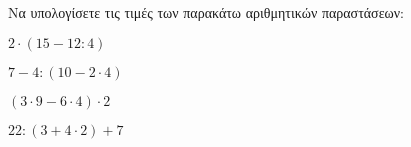 Να υπολογίσετε τις τιμές των παρακάτω αριθμητικών παραστάσεων:
\begin{alist}
\item $ 2\cdot(15-12:4) $
\item $ 7-4:(10-2\cdot 4) $
\item $ (3\cdot 9-6\cdot 4)\cdot 2 $
\item $ 22:(3+4\cdot 2)+7 $
\end{alist}
